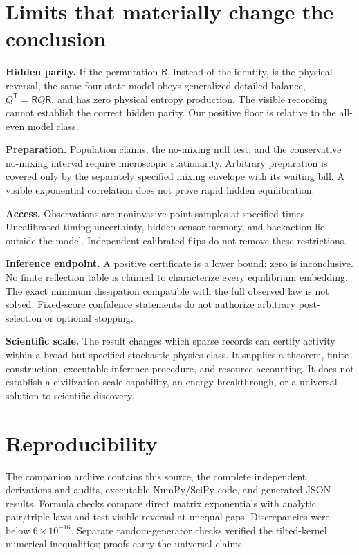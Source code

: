 \documentclass[11pt,a4paper]{article}
\begin{document}
\section{Limits that materially change the conclusion}
\textbf{Hidden parity.} If the permutation $\mathsf R$, instead of the identity, is the physical reversal, the same four-state model obeys generalized detailed balance, $Q^{\mathsf T}=\mathsf RQ\mathsf R$, and has zero physical entropy production. The visible recording cannot establish the correct hidden parity. Our positive floor is relative to the all-even model class.

\textbf{Preparation.} Population claims, the no-mixing null test, and the conservative no-mixing interval require microscopic stationarity. Arbitrary preparation is covered only by the separately specified mixing envelope with its waiting bill. A visible exponential correlation does not prove rapid hidden equilibration.

\textbf{Access.} Observations are noninvasive point samples at specified times. Uncalibrated timing uncertainty, hidden sensor memory, and backaction lie outside the model. Independent calibrated flips do not remove these restrictions.

\textbf{Inference endpoint.} A positive certificate is a lower bound; zero is inconclusive. No finite reflection table is claimed to characterize every equilibrium embedding. The exact minimum dissipation compatible with the full observed law is not solved. Fixed-score confidence statements do not authorize arbitrary post-selection or optional stopping.

\textbf{Scientific scale.} The result changes which sparse records can certify activity within a broad but specified stochastic-physics class. It supplies a theorem, finite construction, executable inference procedure, and resource accounting. It does not establish a civilization-scale capability, an energy breakthrough, or a universal solution to scientific discovery.

\section{Reproducibility}
The companion archive contains this source, the complete independent derivations and audits, executable NumPy/SciPy code, and generated JSON results. Formula checks compare direct matrix exponentials with analytic pair/triple laws and test visible reversal at unequal gaps. Discrepancies were below $6\times10^{-16}$. Separate random-generator checks verified the tilted-kernel numerical inequalities; proofs carry the universal claims.
\end{document}

